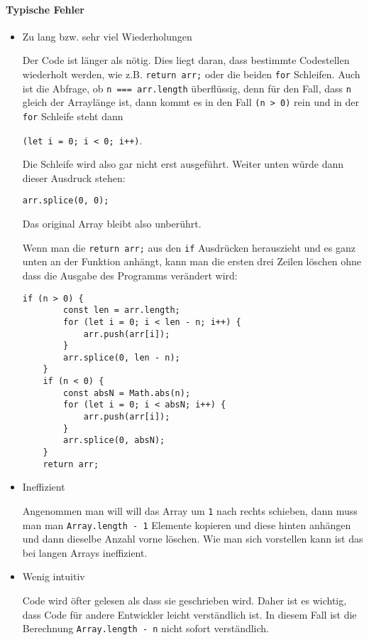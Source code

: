 \documentclass[babel]{book}
\begin{document}
\paragraph{Typische Fehler}
\begin{itemize} 
	\item Zu lang bzw. sehr viel Wiederholungen
	
	Der Code ist länger als nötig. Dies liegt daran, dass bestimmte Codestellen wiederholt werden, wie z.B. \lstinline|return arr;| oder die beiden \lstinline|for| Schleifen. Auch ist die Abfrage, ob \lstinline|n === arr.length| überflüssig, denn für den Fall, dass \lstinline|n| gleich der Arraylänge ist, dann kommt es in den Fall \lstinline|(n > 0)| rein und in der \lstinline|for| Schleife steht dann
	
	\lstinline|(let i = 0; i < 0; i++)|. 
	
	Die Schleife wird also gar nicht erst ausgeführt. Weiter unten würde dann dieser Ausdruck stehen: 
	
	\lstinline|arr.splice(0, 0);|
	
	Das original Array bleibt also unberührt.
	
	Wenn man die \lstinline|return arr;| aus den \lstinline|if| Ausdrücken herauszieht und es ganz unten an der Funktion anhängt, kann man die ersten drei Zeilen löschen ohne dass die Ausgabe des Programms verändert wird:
	
	\begin{lstlisting}[caption=My Javascript Example]
	if (n > 0) {
		const len = arr.length;
		for (let i = 0; i < len - n; i++) {
			arr.push(arr[i]);
		}
		arr.splice(0, len - n);
	}
	if (n < 0) {
		const absN = Math.abs(n);
		for (let i = 0; i < absN; i++) {
			arr.push(arr[i]);
		}
		arr.splice(0, absN);
	}
	return arr;
	\end{lstlisting} 
	
	\item Ineffizient
	
	Angenommen man will will das Array um \lstinline|1| nach rechts schieben, dann muss man man \lstinline|Array.length - 1| Elemente kopieren und diese hinten anhängen und dann dieselbe Anzahl vorne löschen. Wie man sich vorstellen kann ist das bei langen Arrays ineffizient.
	
	\item Wenig intuitiv
	
	Code wird öfter gelesen als dass sie geschrieben wird. Daher ist es wichtig, dass Code für andere Entwickler leicht verständlich ist. In diesem Fall ist die Berechnung \lstinline|Array.length - n| nicht sofort verständlich.
	 
\end{itemize}
\end{document}
